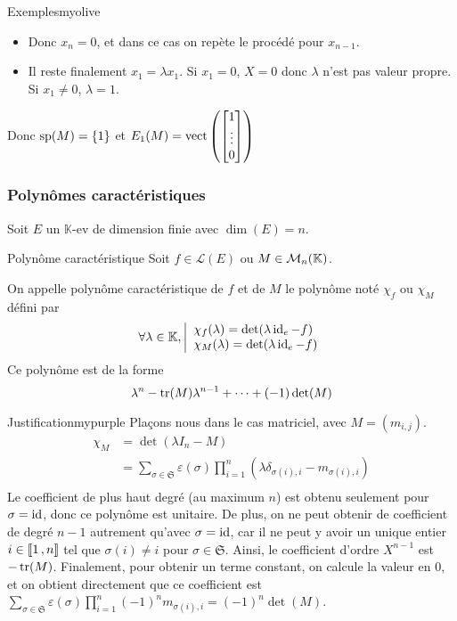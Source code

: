 \begin{omed}{Exemples}{myolive}
\begin{enumerate}[label=\arabic*.]
\begin{itemize}
                \item Donc $x_n = 0$, et dans ce cas on repète le procédé pour $x_{n-1}$. 
                \item Il reste finalement $x_1 = \lambda x_1$. Si $x_1 = 0$, $X = 0$ donc $\lambda$ n’est pas valeur propre. Si $x_1 \neq 0$, $\lambda = 1$.
            \end{itemize}
            Donc $\sp(M) = \left\{1\right\}$ et $E_{1}(M) = \vect\left(\begin{bmatrix}
                1 \\
                \vdots \\
                0
            \end{bmatrix}\right)$
        \end{enumerate}
    \end{omed}

    \subsubsection{Polynômes caractéristiques}

    Soit $E$ un $\mathbb{K}$-ev de dimension finie avec $\dim(E) = n$.

    \begin{defitheo}{Polynôme caractéristique}{}
        Soit $f \in \mathcal{L}(E)$ ou $M \in \mk{n}$.

        On appelle polynôme caractéristique de $f$ et de $M$ le polynôme noté $\chi_f$ ou $\chi_M$ défini par 
        \[ \forall \lambda \in \mathbb{K}, \ou{\chi_f(\lambda) = \det(\lambda \id_e - f)}{\chi_M(\lambda) = \det(\lambda \id_e - f)} \]
        Ce polynôme est de la forme 
        \[ \lambda^n - \tr(M)\lambda^{n-1} + \cdots + (-1) \det(M) \] 
    \end{defitheo}

    \begin{demo}{Justification}{mypurple}
        Plaçons nous dans le cas matriciel, avec $M = (m_{i,j})$.
        \begin{align*}
            \chi_M
            &=\det(\lambda I_n - M) \\
            &= \sum_{\sigma \in \mathfrak{S}} \varepsilon(\sigma) \prod_{i=1}^n \left(\lambda \delta_{\sigma(i),i} - m_{\sigma(i),i}\right) \\
        \end{align*}
        Le coefficient de plus haut degré (au maximum $n$) est obtenu seulement pour $\sigma = \id$, donc ce polynôme est unitaire. De plus, on ne peut obtenir de coefficient de degré $n-1$ autrement qu’avec $\sigma = \id$, car il ne peut y avoir un unique entier $i \in \intervalleEntier{1}{n}$ tel que $\sigma(i) \neq i$ pour $\sigma \in \mathfrak{S}$. Ainsi, le coefficient d’ordre $X^{n-1}$ est $-\tr(M)$. Finalement, pour obtenir un terme constant, on calcule la valeur en $0$, et on obtient directement que ce coefficient est $\sum_{\sigma \in \mathfrak{S}} \varepsilon(\sigma) \prod_{i=1}^n (-1)^n m_{\sigma(i),i} = (-1)^n \det(M)$. 
    \end{demo}

